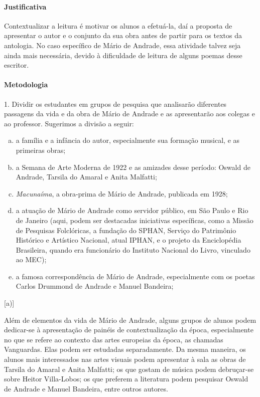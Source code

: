 \documentclass[11pt]{extarticle}
\begin{document}
\paragraph{Justificativa} Contextualizar a leitura é motivar os alunos a
efetuá-la, daí a proposta de apresentar o autor e o conjunto da sua obra
antes de partir para os textos da antologia. No caso específico de Mário
de Andrade, essa atividade talvez seja ainda mais necessária, devido à
dificuldade de leitura de alguns poemas desse escritor.

\paragraph{Metodologia}


1. Dividir os estudantes em grupos de pesquisa que analisarão diferentes
passagens da vida e da obra de Mário de Andrade e as apresentarão aos
colegas e ao professor. Sugerimos a divisão a seguir:

\begin{enumerate}[(a)]
\item a família e a infância do autor, especialmente sua formação musical,
e as primeiras obras;

\item a Semana de Arte Moderna de 1922 e as amizades desse período: Oswald
de Andrade, Tarsila do Amaral e Anita Malfatti;

\item \emph{Macunaíma}, a obra-prima de Mário de Andrade, publicada em
1928;

\item a atuação de Mário de Andrade como servidor público, em São Paulo e
Rio de Janeiro (aqui, podem ser destacadas iniciativas específicas, como
a Missão de Pesquisas Folclóricas, a fundação do SPHAN, Serviço do
Patrimônio Histórico e Artístico Nacional, atual IPHAN, e o projeto da
Enciclopédia Brasileira, quando era funcionário do Instituto Nacional do
Livro, vinculado ao MEC);

\item a famosa correspondência de Mário de Andrade, especialmente com os
poetas Carlos Drummond de Andrade e Manuel Bandeira;
\end{enumerate}[{a})]

Além de elementos da vida de Mário de Andrade, alguns grupos de alunos
podem dedicar-se à apresentação de painéis de contextualização da época,
especialmente no que se refere ao contexto das artes europeias da época,
as chamadas Vanguardas. Elas podem ser estudadas separadamente. Da mesma
maneira, os alunos mais interessados nas artes visuais podem apresentar
à sala as obras de Tarsila do Amaral e Anita Malfatti; os que gostam de
música podem debruçar-se sobre Heitor Villa-Lobos; os que preferem a
literatura podem pesquisar Oswald de Andrade e Manuel Bandeira, entre
outros autores.
\end{document}

